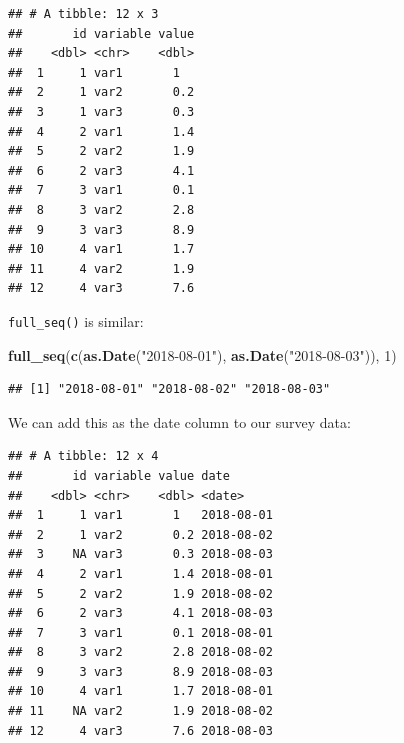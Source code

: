 \documentclass[]{gitbook}
\newenvironment{Shaded}{\begin{snugshade}}{\end{snugshade}}
\newcommand{\DataTypeTok}[1]{\textcolor[rgb]{0.13,0.29,0.53}{#1}}
\newcommand{\DecValTok}[1]{\textcolor[rgb]{0.00,0.00,0.81}{#1}}
\newcommand{\KeywordTok}[1]{\textcolor[rgb]{0.13,0.29,0.53}{\textbf{#1}}}
\newcommand{\NormalTok}[1]{#1}
\newcommand{\OperatorTok}[1]{\textcolor[rgb]{0.81,0.36,0.00}{\textbf{#1}}}
\newcommand{\StringTok}[1]{\textcolor[rgb]{0.31,0.60,0.02}{#1}}
\theoremstyle{definition}
\theoremstyle{definition}
\theoremstyle{definition}
\theoremstyle{remark}
\begin{document}
\begin{verbatim}
## # A tibble: 12 x 3
##       id variable value
##    <dbl> <chr>    <dbl>
##  1     1 var1       1  
##  2     1 var2       0.2
##  3     1 var3       0.3
##  4     2 var1       1.4
##  5     2 var2       1.9
##  6     2 var3       4.1
##  7     3 var1       0.1
##  8     3 var2       2.8
##  9     3 var3       8.9
## 10     4 var1       1.7
## 11     4 var2       1.9
## 12     4 var3       7.6
\end{verbatim}

\texttt{full\_seq()} is similar:

\begin{Shaded}
\begin{Highlighting}[]
\KeywordTok{full_seq}\NormalTok{(}\KeywordTok{c}\NormalTok{(}\KeywordTok{as.Date}\NormalTok{(}\StringTok{"2018-08-01"}\NormalTok{), }\KeywordTok{as.Date}\NormalTok{(}\StringTok{"2018-08-03"}\NormalTok{)), }\DecValTok{1}\NormalTok{)}
\end{Highlighting}
\end{Shaded}

\begin{verbatim}
## [1] "2018-08-01" "2018-08-02" "2018-08-03"
\end{verbatim}

We can add this as the date column to our survey data:

\begin{Shaded}
\end{Shaded}

\begin{verbatim}
## # A tibble: 12 x 4
##       id variable value date      
##    <dbl> <chr>    <dbl> <date>    
##  1     1 var1       1   2018-08-01
##  2     1 var2       0.2 2018-08-02
##  3    NA var3       0.3 2018-08-03
##  4     2 var1       1.4 2018-08-01
##  5     2 var2       1.9 2018-08-02
##  6     2 var3       4.1 2018-08-03
##  7     3 var1       0.1 2018-08-01
##  8     3 var2       2.8 2018-08-02
##  9     3 var3       8.9 2018-08-03
## 10     4 var1       1.7 2018-08-01
## 11    NA var2       1.9 2018-08-02
## 12     4 var3       7.6 2018-08-03
\end{verbatim}
\end{document}
